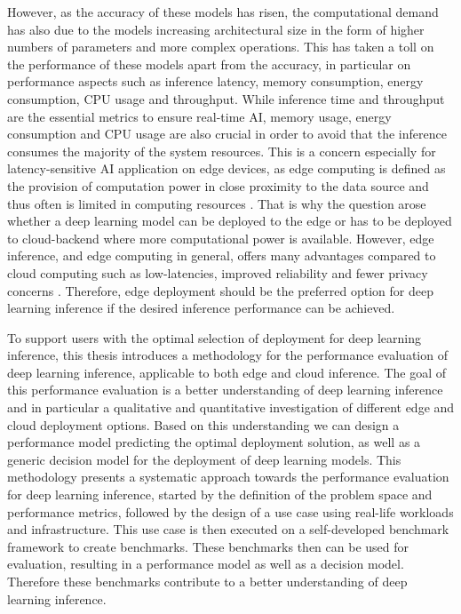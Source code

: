 However, as the accuracy of these models has risen, the computational demand has also due to the models increasing architectural size in the form of higher numbers of parameters and more complex operations.
This has taken a toll on the performance of these models apart from the accuracy, in particular on performance aspects such as inference latency, memory consumption, energy consumption, CPU usage and throughput. 
While inference time and throughput are the essential metrics to ensure real-time AI, memory usage, energy consumption and CPU usage are also crucial in order to avoid that the inference consumes the majority of the system resources.
This is a concern especially for latency-sensitive AI application on edge devices, as edge computing is defined as the provision of computation power in close proximity to the data source \cite{DBLP:journals/corr/abs-1808-05283} and thus often is limited in computing resources \cite{DBLP:journals/corr/abs-1811-11268}. 
That is why the question arose whether a deep learning model can be deployed to the edge or has to be deployed to cloud-backend where more computational power is available.
However, edge inference, and edge computing in general, offers many advantages compared to cloud computing such as low-latencies, improved reliability and fewer privacy concerns \cite{Mor:2018:EC:3305263.3313377}.
Therefore, edge deployment should be the preferred option for deep learning inference if the desired inference performance can be achieved.



To support users with the optimal selection of deployment for deep learning inference, this thesis introduces a methodology for the performance evaluation of deep learning inference, applicable to both edge and cloud inference.
The goal of this performance evaluation is a better understanding of deep learning inference and in particular a qualitative and quantitative investigation of different edge and cloud deployment options.
Based on this understanding we can design a performance model predicting the optimal deployment solution, as well as a generic decision model for the deployment of deep learning models.
This methodology presents a systematic approach towards the performance evaluation for deep learning inference, started by the definition of the problem space and performance metrics, followed by the design of a use case using real-life workloads and infrastructure. This use case is then executed on a self-developed benchmark framework to create benchmarks.
These benchmarks then can be used for evaluation, resulting in a performance model as well as a decision model. Therefore these benchmarks contribute to a better understanding of deep learning inference.


